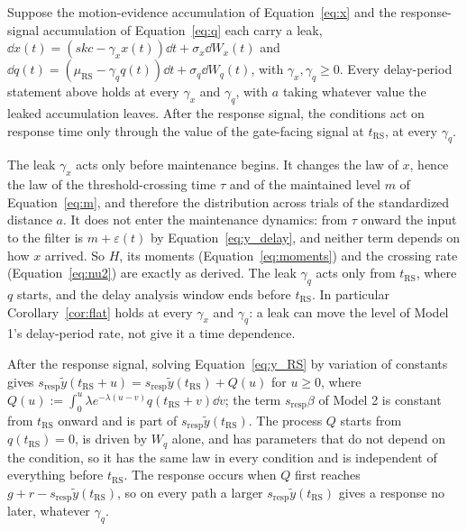 
\begin{remark}\label{rem:leak}
Suppose the motion-evidence accumulation of Equation~\eqref{eq:x} and the response-signal accumulation of Equation~\eqref{eq:q} each carry a leak, $\dd x\left(t\right)=\left(skc-{\gamma }_{x}x\left(t\right)\right)\dd t+{\sigma }_{x}\dd {W}_{x}\left(t\right)$ and $\dd q\left(t\right)=\left({\mu }_{\mathrm{RS}}-{\gamma }_{q}q\left(t\right)\right)\dd t+{\sigma }_{q}\dd {W}_{q}\left(t\right)$, with ${\gamma }_{x},{\gamma }_{q}\ge 0$. Every delay-period statement above holds at every ${\gamma }_{x}$ and ${\gamma }_{q}$, with $a$ taking whatever value the leaked accumulation leaves. After the response signal, the conditions act on response time only through the value of the gate-facing signal at ${t}_{\mathrm{RS}}$, at every ${\gamma }_{q}$.
\end{remark}

The leak ${\gamma }_{x}$ acts only before maintenance begins. It changes the law of $x$, hence the law of the threshold-crossing time $\tau $ and of the maintained level $m$ of Equation~\eqref{eq:m}, and therefore the distribution across trials of the standardized distance $a$. It does not enter the maintenance dynamics: from $\tau $ onward the input to the filter is $m+\varepsilon \left(t\right)$ by Equation~\eqref{eq:y_delay}, and neither term depends on how $x$ arrived. So $H$, its moments (Equation~\eqref{eq:moments}) and the crossing rate (Equation~\eqref{eq:nu2}) are exactly as derived. The leak ${\gamma }_{q}$ acts only from ${t}_{\mathrm{RS}}$, where $q$ starts, and the delay analysis window ends before ${t}_{\mathrm{RS}}$. In particular Corollary~\ref{cor:flat} holds at every ${\gamma }_{x}$ and ${\gamma }_{q}$: a leak can move the level of Model 1's delay-period rate, not give it a time dependence.

After the response signal, solving Equation~\eqref{eq:y_RS} by variation of constants gives ${s}_{\mathrm{resp}}\tilde{y}\left({t}_{\mathrm{RS}}+u\right)={s}_{\mathrm{resp}}\tilde{y}\left({t}_{\mathrm{RS}}\right)+Q\left(u\right)$ for $u\ge 0$, where $Q\left(u\right):=\int_{0}^{u}\lambda {e}^{-\lambda \left(u-v\right)}q\left({t}_{\mathrm{RS}}+v\right)\dd v$; the term ${s}_{\mathrm{resp}}\beta $ of Model 2 is constant from ${t}_{\mathrm{RS}}$ onward and is part of ${s}_{\mathrm{resp}}\tilde{y}\left({t}_{\mathrm{RS}}\right)$. The process $Q$ starts from $q\left({t}_{\mathrm{RS}}\right)=0$, is driven by ${W}_{q}$ alone, and has parameters that do not depend on the condition, so it has the same law in every condition and is independent of everything before ${t}_{\mathrm{RS}}$. The response occurs when $Q$ first reaches $g+r-{s}_{\mathrm{resp}}\tilde{y}\left({t}_{\mathrm{RS}}\right)$, so on every path a larger ${s}_{\mathrm{resp}}\tilde{y}\left({t}_{\mathrm{RS}}\right)$ gives a response no later, whatever ${\gamma }_{q}$.
